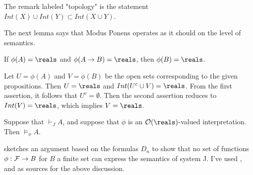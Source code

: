 The remark labeled "topology" is the statement $Int(X) \cup Int(Y) \subset Int(X \cup Y)$.

The next lemma says that Modus Ponens operates as it should 
on the level of semantics.

\begin{lemma}
If $\phi(A) = \reals$ and $\phi(A \to B) = \reals$, then $\phi(B) = \reals$.
\end{lemma}

 Let $U = \phi(A)$ and $V = \phi(B)$ be the open sets corresponding to the given propositions.  Then $U = \reals$ and $Int( U^c \cup V) = \reals$.  From the first assertion, it follows that $U^c = \emptyset$.  Then the second assertion reduces to $Int(V) = \reals$, which implies $V = \reals$. 

\begin{theorem}
Suppose that $\vdash_J A$, and suppose that $\phi$ is an $\opensets(\reals)$-valued interpretation.  Then $\models_\phi A$.
\end{theorem}


\cite{RH} sketches an argument based on the formulas $D_n$ to show that no set of functions $\phi: \mathcal{F} \to B$ for $B$ a finite set can express the semantics of system J. I've used \cite{RH}, \cite{WKIL} and \cite{EPS} as sources for the above discussion.  


